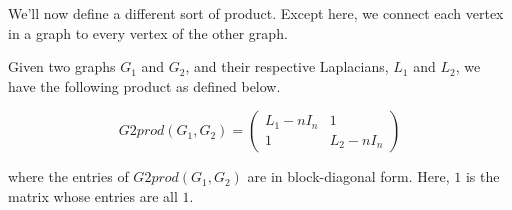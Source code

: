 We'll now define a different sort of product. Except here, we connect each vertex in a graph to every vertex of the other graph.

\begin{definition}
    Given two graphs $G_1$ and $G_2$, and their respective Laplacians, $L_1$ and $L_2$, we have the following product as defined below.
    
    \begin{equation}
        G2prod(G_1,G_2) =
            \begin{pmatrix}
                L_1 - n I_n &   1 \\
                1           &   L_2 - n I_n
            \end{pmatrix}
    \end{equation}
    
    where the entries of $G2prod(G_1,G_2)$ are in block-diagonal form. Here, $1$ is the matrix whose entries are all $1$.
\end{definition}